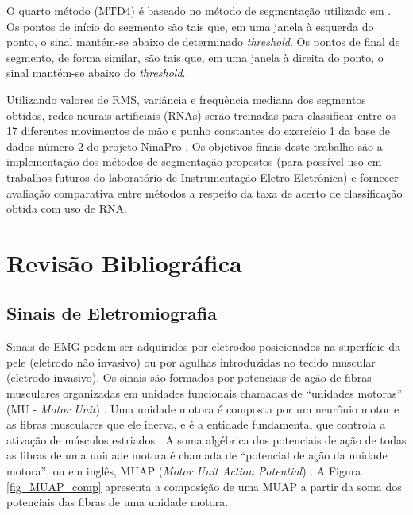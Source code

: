 O quarto método (MTD4) é baseado no método de segmentação utilizado em \cite{Pattichis1995}. Os pontos de início do segmento são tais que, em uma janela à esquerda do ponto, o sinal mantém-se abaixo de determinado \emph{threshold}. Os pontos de final de segmento, de forma similar, são tais que, em uma janela à direita do ponto, o sinal mantém-se abaixo do \emph{threshold}.

Utilizando valores de RMS, variância e frequência mediana dos segmentos obtidos, redes neurais artificiais (RNAs) serão treinadas para classificar entre os 17 diferentes movimentos de mão e punho constantes do exercício 1 da base de dados número 2 do projeto NinaPro \cite{Gijsberts2014}. Os objetivos finais deste trabalho são a implementação dos métodos de segmentação propostos (para possível uso em trabalhos futuros do laboratório de Instrumentação Eletro-Eletrônica) e fornecer avaliação comparativa entre métodos a respeito da taxa de acerto de classificação obtida com uso de RNA.

	\chapter{Revisão Bibliográfica}
		\section{Sinais de Eletromiografia}
Sinais de EMG podem ser adquiridos por eletrodos posicionados na superfície da pele (eletrodo não invasivo) ou por agulhas introduzidas no tecido muscular (eletrodo invasivo). Os sinais são formados por potenciais de ação de fibras musculares organizadas em unidades funcionais chamadas de ``unidades motoras'' (MU - \emph{Motor Unit}) \cite{Luca2006}. Uma unidade motora é composta por um neurônio motor e as fibras musculares que ele inerva, e é a entidade fundamental que controla a ativação de músculos estriados \cite{Buchthal980}. A soma algébrica dos potenciais de ação de todas as fibras de uma unidade motora é chamada de ``potencial de ação da unidade motora'', ou em inglês, MUAP (\emph{Motor Unit Action Potential}) \cite{Almeida1997}. A Figura \ref{fig_MUAP_comp} apresenta a composição de uma MUAP a partir da soma dos potenciais das fibras de uma unidade motora.

